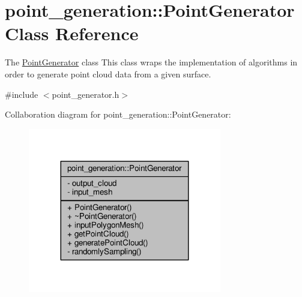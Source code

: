 \hypertarget{classpoint__generation_1_1_point_generator}{}\section{point\+\_\+generation\+:\+:Point\+Generator Class Reference}
\label{classpoint__generation_1_1_point_generator}


The \hyperlink{classpoint__generation_1_1_point_generator}{Point\+Generator} class This class wraps the implementation of algorithms in order to generate point cloud data from a given surface.  




{\ttfamily \#include $<$point\+\_\+generator.\+h$>$}



Collaboration diagram for point\+\_\+generation\+:\+:Point\+Generator\+:
\nopagebreak
\begin{figure}[H]
\begin{center}
\leavevmode
\includegraphics[width=239pt]{classpoint__generation_1_1_point_generator__coll__graph}
\end{center}
\end{figure}
